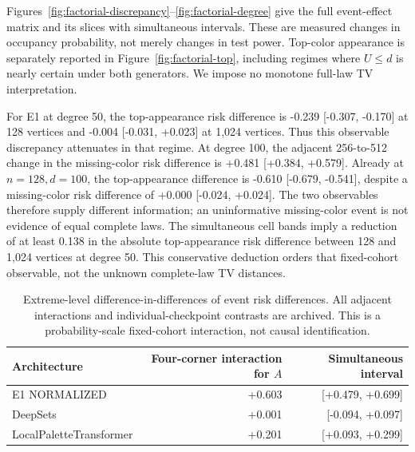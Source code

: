 Figures~\ref{fig:factorial-discrepancy}--\ref{fig:factorial-degree}
give the full event-effect matrix and its slices with simultaneous intervals.
These are measured changes in occupancy probability, not merely changes in
test power. Top-color appearance is separately reported in
Figure~\ref{fig:factorial-top}, including regimes where $U\le d$ is nearly
certain under both generators. We impose no monotone full-law TV interpretation.

For E1 at degree 50, the top-appearance risk difference is
-0.239 [-0.307, -0.170] at 128 vertices and
-0.004 [-0.031, +0.023] at 1,024 vertices.
Thus this observable discrepancy attenuates in that regime. At degree 100,
the adjacent 256-to-512 change in the missing-color risk difference is
+0.481 [+0.384, +0.579].
Already at $n=128,d=100$, the top-appearance difference is
-0.610 [-0.679, -0.541], despite a missing-color
risk difference of +0.000 [-0.024, +0.024].
The two observables therefore supply different information; an uninformative
missing-color event is not evidence of equal complete laws.
The simultaneous cell bands imply a reduction of at least 0.138
in the absolute top-appearance risk difference between 128 and 1,024 vertices
at degree 50. This conservative deduction orders that fixed-cohort observable,
not the unknown complete-law TV distances.

\begin{table}[t]
\centering\small
\begin{tabular}{lrr}
\toprule Architecture & Four-corner interaction for $A$ & Simultaneous interval\\
\midrule
E1 NORMALIZED & +0.603 & [+0.479, +0.699] \\
DeepSets & +0.001 & [-0.094, +0.097] \\
LocalPaletteTransformer & +0.201 & [+0.093, +0.299] \\
\bottomrule
\end{tabular}
\caption{Extreme-level difference-in-differences of event risk differences.
All adjacent interactions and individual-checkpoint contrasts are archived.
This is a probability-scale fixed-cohort interaction, not causal identification.}
\label{tab:factorial-interaction}
\end{table}

